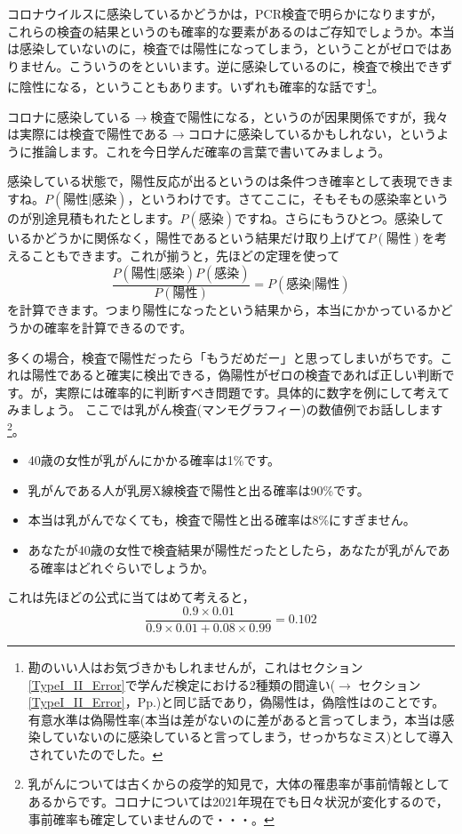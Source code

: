 \documentclass{ltjsbook}
\begin{document}
コロナウイルスに感染しているかどうかは，PCR検査で明らかになりますが，これらの検査の結果というのも確率的な要素があるのはご存知でしょうか。本当は感染していないのに，検査では陽性になってしまう，ということがゼロではありません。こういうのをといいます。逆に感染しているのに，検査で検出できずに陰性になる，ということもあります。いずれも確率的な話です\footnote{勘のいい人はお気づきかもしれませんが，これはセクション\ref{TypeI_II_Error}で学んだ検定における2種類の間違い($\to$ セクション\ref{TypeI_II_Error}，Pp.\pageref{TypeI_II_Error})と同じ話であり，偽陽性は，偽陰性はのことです。有意水準は偽陽性率(本当は差がないのに差があると言ってしまう，本当は感染していないのに感染していると言ってしまう，せっかちなミス)として導入されていたのでした。}。

コロナに感染している$\to$検査で陽性になる，というのが因果関係ですが，我々は実際には検査で陽性である$\to$コロナに感染しているかもしれない，というように推論します。これを今日学んだ確率の言葉で書いてみましょう。

感染している状態で，陽性反応が出るというのは条件つき確率として表現できますね。$P(\mbox{陽性}|\mbox{感染})$，というわけです。さてここに，そもそもの感染率というのが別途見積もれたとします。$P(\mbox{感染})$ですね。さらにもうひとつ。感染しているかどうかに関係なく，陽性であるという結果だけ取り上げて$P(\mbox{陽性})$を考えることもできます。これが揃うと，先ほどの定理を使って
\[ \frac{P(\mbox{陽性}|\mbox{感染})P(\mbox{感染})}{P(\mbox{陽性})} = P(\mbox{感染}|\mbox{陽性})\]
を計算できます。つまり陽性になったという結果から，本当にかかっているかどうかの確率を計算できるのです。

多くの場合，検査で陽性だったら「もうだめだー」と思ってしまいがちです。これは陽性であると確実に検出できる，偽陽性がゼロの検査であれば正しい判断です。が，実際には確率的に判断すべき問題です。具体的に数字を例にして考えてみましょう。
ここでは乳がん検査(マンモグラフィー)の数値例でお話しします\footnote{乳がんについては古くからの疫学的知見で，大体の罹患率が事前情報としてあるからです。コロナについては2021年現在でも日々状況が変化するので，事前確率も確定していませんので・・・。}。
\begin{itemize}
	\item 40歳の女性が乳がんにかかる確率は1\%です。
	\item 乳がんである人が乳房X線検査で陽性と出る確率は90\%です。
	\item 本当は乳がんでなくても，検査で陽性と出る確率は8\%にすぎません。
	\item あなたが40歳の女性で検査結果が陽性だったとしたら，あなたが乳がんである確率はどれぐらいでしょうか。
\end{itemize}
これは先ほどの公式に当てはめて考えると，
\[\frac{0.9\times0.01}{0.9\times0.01+0.08\times0.99}=0.102 \]
\end{document}
